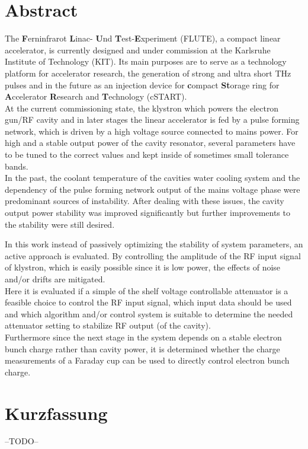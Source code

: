 \section*{Abstract}
The \textbf{F}erninfrarot \textbf{L}inac- \textbf{U}nd \textbf{T}est-\textbf{E}xperiment (FLUTE), a compact linear accelerator, is currently designed and under commission at the Karlsruhe Institute of Technology (KIT). Its main purposes are to serve as a technology platform for accelerator research, the generation of strong and ultra short THz pulses and in the future as an injection device for \textbf{c}ompact \textbf{St}orage ring for \textbf{A}ccelerator \textbf{R}esearch and \textbf{T}echnology (cSTART).\\
At the current commissioning state, the klystron which powers the electron gun/RF cavity and in later stages the linear accelerator is fed by a pulse forming network, which is driven by a high voltage source connected to mains power. For high and a stable output power of the cavity resonator, several parameters have to be tuned to the correct values and kept inside of sometimes small tolerance bands.\\
In the past, the coolant temperature of the cavities water cooling system and the dependency of the pulse forming network output of the mains voltage phase were predominant sources of instability. After dealing with these issues, the cavity output power stability was improved significantly but further improvements to the stability were still desired.

In this work instead of passively optimizing the stability of system parameters, an active approach is evaluated. By controlling the amplitude of the RF input signal of klystron, which is easily possible since it is low power, the effects of noise and/or drifts are mitigated.\\
Here it is evaluated if a simple of the shelf voltage controllable attenuator is a feasible choice to control the RF input signal, which input data should be used and which algorithm and/or control system is suitable to determine the needed attenuator setting to stabilize RF output (of the cavity).\\
Furthermore since the next stage in the system depends on a stable electron bunch charge rather than cavity power, it is determined whether the charge measurements of a Faraday cup can be used to directly control electron bunch charge.

\section*{Kurzfassung}
--TODO--